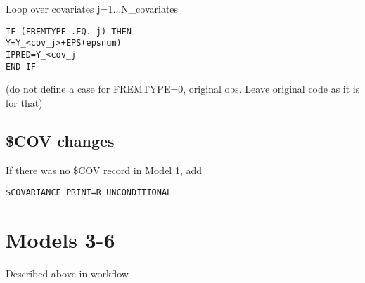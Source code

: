 Loop over covariates j=1...N\_covariates %
\begin{verbatim}
IF (FREMTYPE .EQ. j) THEN
Y=Y_<cov_j>+EPS(epsnum)
IPRED=Y_<cov_j
END IF
\end{verbatim}


(do not define a case for FREMTYPE=0, original obs. Leave original code as it is for that)

\subsection{\$COV changes}
If there was no \$COV record in Model 1, add
\begin{verbatim}
$COVARIANCE PRINT=R UNCONDITIONAL
\end{verbatim}

\section{Models 3-6}

Described above in workflow




